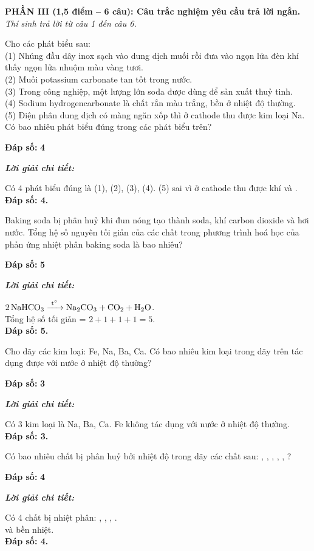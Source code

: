 \documentclass[11pt,a4paper]{article}
\def\loigiai#1{
\par\begingroup\color{blue!80!black}\small
\noindent\textbf{\textit{Lời giải chi tiết:}}\par
#1\par\endgroup}
\begin{document}
\noindent
\textbf{PHẦN III (1,5 điểm -- 6 câu): Câu trắc nghiệm yêu cầu trả lời ngắn.}\\
\textit{Thí sinh trả lời từ câu 1 đến câu 6.}

\setcounter{ex}{0}

\begin{ex}
Cho các phát biểu sau:\\
(1) Nhúng đầu dây inox sạch vào dung dịch muối  rồi đưa vào ngọn lửa đèn khí thấy ngọn lửa nhuộm màu vàng tươi.\\
(2) Muối potassium carbonate tan tốt trong nước.\\
(3) Trong công nghiệp, một lượng lớn soda được dùng để sản xuất thuỷ tinh.\\
(4) Sodium hydrogencarbonate là chất rắn màu trắng, bền ở nhiệt độ thường.\\
(5) Điện phân dung dịch  có màng ngăn xốp thì ở cathode thu được kim loại Na.\\
Có bao nhiêu phát biểu đúng trong các phát biểu trên?
\par\noindent\textbf{Đáp số:} \textbf{\color{red}4}
\loigiai{
Có 4 phát biểu đúng là (1), (2), (3), (4). (5) sai vì ở cathode thu được khí \ce{H2} và \ce{NaOH}.\\
\textbf{Đáp số: 4.}}
\end{ex}

\begin{ex}
Baking soda bị phân huỷ khi đun nóng tạo thành soda, khí carbon dioxide và hơi nước. Tổng hệ số nguyên tối giản của các chất trong phương trình hoá học của phản ứng nhiệt phân baking soda là bao nhiêu?
\par\noindent\textbf{Đáp số:} \textbf{\color{red}5}
\loigiai{
$\ce{2NaHCO3 ->[t^\circ] Na2CO3 + CO2 + H2O}$.\\
Tổng hệ số tối giản = $2 + 1 + 1 + 1 = 5$.\\
\textbf{Đáp số: 5.}}
\end{ex}

\begin{ex}
Cho dãy các kim loại: Fe, Na, Ba, Ca. Có bao nhiêu kim loại trong dãy trên tác dụng được với nước ở nhiệt độ thường?
\par\noindent\textbf{Đáp số:} \textbf{\color{red}3}
\loigiai{
Có 3 kim loại là Na, Ba, Ca. Fe không tác dụng với nước ở nhiệt độ thường.\\
\textbf{Đáp số: 3.}}
\end{ex}

\begin{ex}
Có bao nhiêu chất bị phân huỷ bởi nhiệt độ trong dãy các chất sau: , , , , , ?
\par\noindent\textbf{Đáp số:} \textbf{\color{red}4}
\loigiai{
Có 4 chất bị nhiệt phân: , , \ce{Mg(NO3)2}, \ce{NaHCO3}.\\
\ce{Na2CO3} và \ce{CaSO4} bền nhiệt.\\
\textbf{Đáp số: 4.}}
\end{ex}
\end{document}
